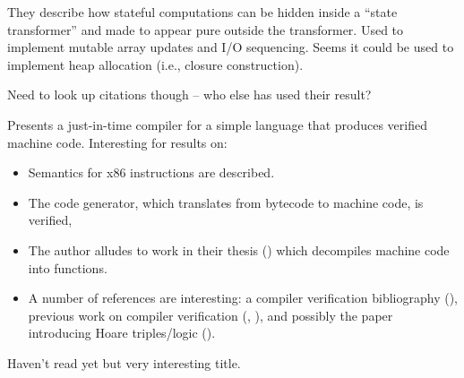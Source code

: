 \documentclass[11pt]{article}
\begin{document}

They describe how stateful computations can be hidden inside a ``state
transformer'' and made to appear pure outside the transformer. Used to
implement mutable array updates and I/O sequencing. Seems it could be
used to implement heap allocation (i.e., closure construction).

Need to look up citations though -- who else has used their result?


Presents a just-in-time compiler for a simple language that 
produces verified machine code. Interesting for results on:

\begin{itemize}
\item Semantics for x86 instructions are described.
\item The code generator, which translates from bytecode to machine code,
is verified,
\item The author alludes to work in their thesis (\cite{Myreen09Formal}) which
decompiles machine code into functions.
\item A number of references are interesting: a compiler verification
  bibliography (\cite{Dave03Compiler}), previous work on compiler verification (\cite{Myreen09Extensible},
  \cite{Myreen08Machine}), and possibly the paper introducing Hoare triples/logic (\cite{Hoare69Axiomatic}).
 
\end{itemize}


Haven't read yet but very interesting title.
\end{document}
